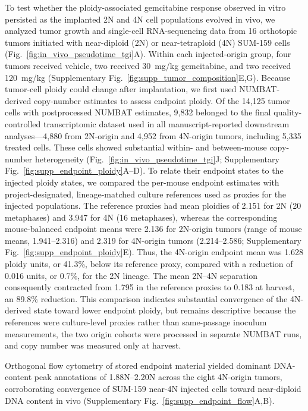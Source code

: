 \documentclass[11pt,notitlepage]{article}
\begin{document}
To test whether the ploidy-associated gemcitabine response observed in vitro persisted as the implanted 2N and 4N cell populations evolved in vivo, we analyzed tumor growth and single-cell RNA-sequencing data from 16 orthotopic tumors initiated with near-diploid (2N) or near-tetraploid (4N) SUM-159 cells (Fig.~\ref{fig:in_vivo_pseudotime_tgi}A). Within each injected-origin group, four tumors received vehicle, two received 30~mg/kg gemcitabine, and two received 120~mg/kg (Supplementary Fig.~\ref{fig:supp_tumor_composition}E,G). Because tumor-cell ploidy could change after implantation, we first used NUMBAT-derived copy-number estimates to assess endpoint ploidy. Of the 14,125 tumor cells with postprocessed NUMBAT estimates, 9,832 belonged to the final quality-controlled transcriptomic dataset used in all manuscript-reported downstream analyses---4,880 from 2N-origin and 4,952 from 4N-origin tumors, including 5,335 treated cells. These cells showed substantial within- and between-mouse copy-number heterogeneity (Fig.~\ref{fig:in_vivo_pseudotime_tgi}J; Supplementary Fig.~\ref{fig:supp_endpoint_ploidy}A--D). To relate their endpoint states to the injected ploidy states, we compared the per-mouse endpoint estimates with project-designated, lineage-matched culture references used as proxies for the injected populations. The reference proxies had mean ploidies of 2.151 for 2N (20 metaphases) and 3.947 for 4N (16 metaphases), whereas the corresponding mouse-balanced endpoint means were 2.136 for 2N-origin tumors (range of mouse means, 1.941--2.316) and 2.319 for 4N-origin tumors (2.214--2.586; Supplementary Fig.~\ref{fig:supp_endpoint_ploidy}E). Thus, the 4N-origin endpoint mean was 1.628 ploidy units, or 41.3\%, below its reference proxy, compared with a reduction of 0.016 units, or 0.7\%, for the 2N lineage. The mean 2N--4N separation consequently contracted from 1.795 in the reference proxies to 0.183 at harvest, an 89.8\% reduction. This comparison indicates substantial convergence of the 4N-derived state toward lower endpoint ploidy, but remains descriptive because the references were culture-level proxies rather than same-passage inoculum measurements, the two origin cohorts were processed in separate NUMBAT runs, and copy number was measured only at harvest.

Orthogonal flow cytometry of stored endpoint material yielded dominant DNA-content peak annotations of 1.88N--2.20N across the eight 4N-origin tumors, corroborating convergence of SUM-159 near-4N injected cells toward near-diploid DNA content in vivo (Supplementary Fig.~\ref{fig:supp_endpoint_flow}A,B).
\end{document}

